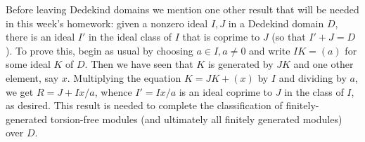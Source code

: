 \documentclass[10pt]{article}
\begin{document}
Before leaving Dedekind domains we mention one other result that will be
needed in this week's homework: given a nonzero ideal $I,J$ in a
Dedekind domain $D$, there is an ideal $I'$ in the ideal class of $I$
that is coprime to $J$ (so that $I'+J = D$). To prove this, begin as
usual by choosing $a\in I, a\ne0$ and write $IK = (a)$ for some ideal
$K$ of $D$. Then we have seen that $K$ is generated by $JK$ and one
other element, say $x$. Multiplying the equation $K = JK + (x)$ by $I$
and dividing by $a$, we get $R = J + Ix/a$, whence $I' = Ix/a$ is an
ideal coprime to $J$ in the class of $I$, as desired. This result is
needed to complete the classification of finitely-generated torsion-free
modules (and ultimately all finitely generated modules) over $D$.
\end{document}
